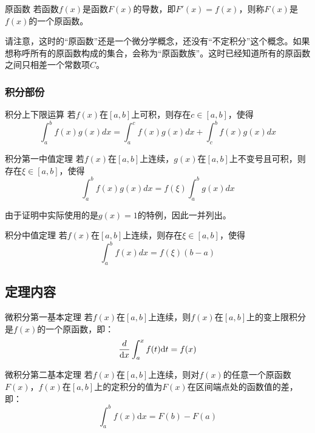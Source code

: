 \begin{definition}{原函数}\label{def_FTcalc_3}
若函数$f(x)$是函数$F(x)$的导数，即$F'(x)=f(x)$，则称$F(x)$是$f(x)$的一个原函数。
\end{definition}

请注意，这时的“原函数”还是一个微分学概念，还没有“不定积分”这个概念。如果想称呼所有的原函数构成的集合，会称为“原函数族”。这时已经知道所有的原函数之间只相差一个常数项$C$。

\subsubsection{积分部份}

\begin{lemma}{积分上下限运算}\label{lem_FTcalc_1}
若$f(x)$在$[a,b]$上可积，则存在$c\in[a,b]$，使得
$$\int_{a}^{b} f(x)g(x)dx=\int_{a}^{c} f(x)g(x)dx+\int_{c}^{b} f(x)g(x)dx$$
\end{lemma}

\begin{lemma}{积分第一中值定理}
若$f(x)$在$[a,b]$上连续，$g(x)$在$[a,b]$上不变号且可积，则存在$\xi\in[a,b]$，使得
$$\int_{a}^{b} f(x)g(x)dx=f(\xi)\int_{a}^{b} g(x)dx$$
\end{lemma}

由于证明中实际使用的是$g(x)=1$的特例，因此一并列出。

\begin{lemma}{积分中值定理}\label{lem_FTcalc_2}
若$f(x)$在$[a,b]$上连续，则存在$\xi\in[a,b]$，使得
$$\int_{a}^{b} f(x)dx=f(\xi)(b-a)$$
\end{lemma}

\subsection{定理内容}

\begin{theorem}{微积分第一基本定理}
若$f(x)$在$[a,b]$上连续，则$f(x)$在$[a,b]$上的变上限积分是$f(x)$的一个原函数，即：
$${d\over\mathrm {d}x}\int_{a}^{x}f(t)\mathrm {d}t=f(x)$$
\end{theorem}

\begin{theorem}{微积分第二基本定理}
若$f(x)$在$[a,b]$上连续，则对$f(x)$的任意一个原函数$F(x)$，$f(x)$在$[a,b]$上的定积分的值为$F(x)$在区间端点处的函数值的差，即：
$$\int_{a}^{b} f(x)\mathrm {d}x=F(b)-F(a)$$
\end{theorem}

